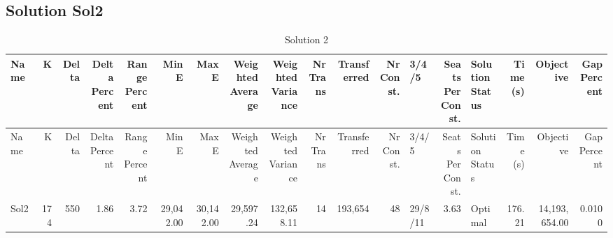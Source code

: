 \documentclass[a4paper]{article}
\begin{document}
\clearpage
\subsection{Solution Sol2}

{\scriptsize
\begin{longtable}{lrrrrrrrrrrrlrlrrr}
\caption{Solution 2}
\\ \toprule
Name &K &Delta &\shortstack{Delta\\Percent} &\shortstack{Range\\Percent} &Min E &Max E &\shortstack{Weighted\\Average} &\shortstack{Weighted\\Variance} &\shortstack{Nr\\Trans} &Transferred &\shortstack{Nr\\Const.} &3/4/5 &\shortstack{Seats\\Per\\Const.} &\shortstack{Solution\\Status} &\shortstack{Time\\(s)} &Objective &\shortstack{Gap\\Percent} \\ \midrule
\endfirsthead
\toprule
Name &K &Delta &\shortstack{Delta\\Percent} &\shortstack{Range\\Percent} &Min E &Max E &\shortstack{Weighted\\Average} &\shortstack{Weighted\\Variance} &\shortstack{Nr\\Trans} &Transferred &\shortstack{Nr\\Const.} &3/4/5 &\shortstack{Seats\\Per\\Const.} &\shortstack{Solution\\Status} &\shortstack{Time\\(s)} &Objective &\shortstack{Gap\\Percent} \\ \midrule
\endhead
\bottomrule
\endfoot
Sol2&174&550& 1.86& 3.72&29,042.00&30,142.00&29,597.24&132,658.11&14&193,654&48&29/8/11& 3.63&Optimal&176.21&14,193,654.00&0.0100\\ 
\end{longtable}

}
\end{document}
